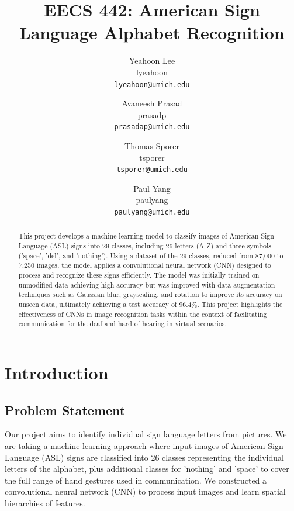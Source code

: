 \documentclass[10pt,twocolumn,letterpaper]{article}
\begin{document}
\title{EECS 442: American Sign Language Alphabet Recognition}

\author{Yeahoon Lee\\
lyeahoon\\
{\tt\small lyeahoon@umich.edu}
\and
Avaneesh Prasad\\
prasadp\\
{\tt\small prasadap@umich.edu}
\and
Thomas Sporer\\
tsporer\\
{\tt\small tsporer@umich.edu}
\and
Paul Yang\\
paulyang\\
{\tt\small paulyang@umich.edu}
}
\maketitle

\begin{abstract}
    This project develops a machine learning model to classify images of American
    Sign Language (ASL) signs into 29 classes, including 26 letters (A-Z)
    and three symbols ('space', 'del', and 'nothing'). Using a dataset of 
    the 29 classes, reduced from 87,000 to 7,250 images, the model applies
    a convolutional neural network (CNN) designed to process and recognize
    these signs efficiently. The model was initially trained on unmodified
    data achieving high accuracy but was improved with data augmentation 
    techniques such as Gaussian blur, grayscaling, and rotation to improve
    its accuracy on unseen data, ultimately achieving a test accuracy of 96.4\%.
    This project highlights the effectiveness of CNNs in image recognition
    tasks within the context of facilitating communication for the deaf 
    and hard of hearing in virtual scenarios.
\end{abstract}

\section{Introduction}
\label{sec:intro}

\subsection{Problem Statement}
Our project aims to identify individual sign language letters from pictures. 
We are taking a machine learning approach where input images of American Sign Language (ASL) signs
are classified into 26 classes representing the individual letters
of the alphabet, plus additional classes for 'nothing' and 'space' to cover
the full range of hand gestures used in communication. We constructed a convolutional neural network (CNN)
to process input images and learn spatial hierarchies of features.
\end{document}
